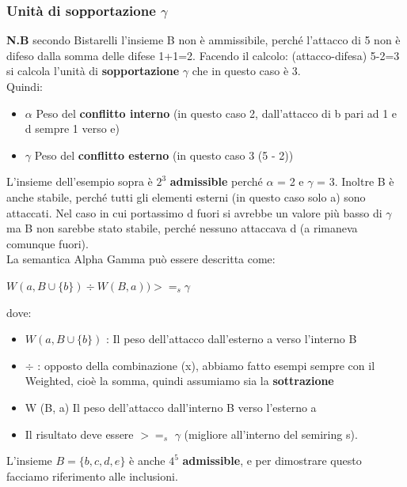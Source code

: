     \subsubsection{Unità di sopportazione $\gamma$}
    \textbf{N.B} secondo Bistarelli l'insieme B non è ammissibile, perché
    l'attacco di 5 non è difeso dalla somma delle difese 1+1=2. Facendo il
    calcolo: (attacco-difesa) 5-2=3 si calcola l'unità di \textbf{sopportazione}
$\gamma$ che in questo caso è 3. \\Quindi:
    \begin{itemize}
        \item $\alpha$ Peso del \textbf{conflitto interno} (in questo caso 2,
              dall'attacco di b pari ad 1 e d sempre 1 verso e)
        \item $\gamma$ Peso del \textbf{conflitto esterno} (in questo caso 3 (5
              - 2))
    \end{itemize}
    L'insieme dell'esempio sopra è $2^3$ \textbf{admissible} perché $\alpha$ = 2
    e $\gamma$ = 3. Inoltre B è anche stabile, perché tutti gli elementi esterni
    (in questo caso solo a) sono attaccati. Nel caso in cui portassimo d fuori
    si avrebbe un valore più basso di $\gamma$ ma B non sarebbe stato stabile,
    perché nessuno attaccava d (a rimaneva comunque fuori). \\
    La semantica Alpha Gamma può essere descritta come:
    \begin{center}
        $W (a, B \cup \{b\}) \div W (B, a)) >=_s \gamma$
    \end{center}
    dove:
    \begin{itemize}
        \item $W (a, B \cup \{b\})$ : Il peso dell'attacco dall'esterno a verso
              l'interno B
        \item $\div$ : opposto della combinazione (x), abbiamo fatto esempi
              sempre con il Weighted, cioè la somma, quindi assumiamo sia la
              \textbf{sottrazione}
        \item W (B, a) Il peso dell'attacco dall'interno B verso l'esterno a
        \item Il risultato deve essere $>=_s$ $\gamma$ (migliore all'interno del
              semiring s).
    \end{itemize}
    L'insieme $B = \{b, c, d, e\}$ è anche $4^5$ \textbf{admissible}, e per
    dimostrare questo facciamo riferimento alle inclusioni.

